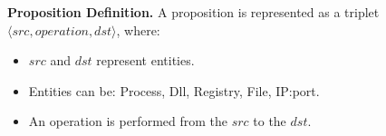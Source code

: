 

\noindent
{\bf Proposition Definition.}
A proposition is represented as a triplet $\langle src, operation, dst\rangle$, where:
\begin{itemize}
    \item $src$ and $dst$ represent entities.
    \item Entities can be: Process, Dll, Registry, File, IP:port.
    \item An operation is performed from the $src$ to the $dst$.
\end{itemize}

